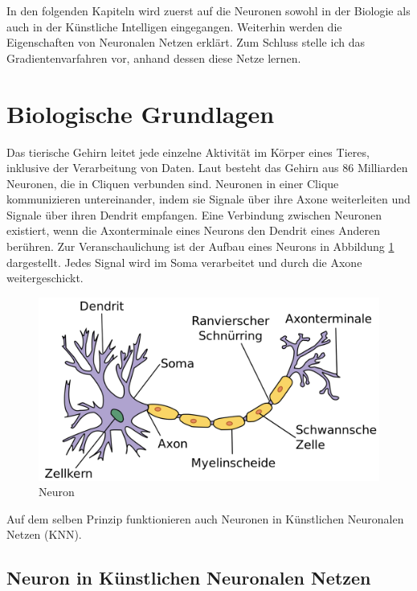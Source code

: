 In den folgenden Kapiteln wird zuerst auf die Neuronen sowohl in der Biologie als auch in der Künstliche Intelligen eingegangen. Weiterhin werden die Eigenschaften von Neuronalen Netzen erklärt. Zum Schluss stelle ich das Gradientenvarfahren vor, anhand dessen diese Netze lernen.

\section{Biologische Grundlagen}

Das tierische Gehirn leitet jede einzelne Aktivität im Körper eines Tieres, inklusive der Verarbeitung von Daten. Laut \cite{GEHIRN:12} besteht das Gehirn aus 86 Milliarden Neuronen, die in Cliquen verbunden sind. Neuronen in einer Clique kommunizieren untereinander, indem sie Signale über ihre Axone weiterleiten und Signale über ihren Dendrit empfangen. Eine Verbindung zwischen Neuronen existiert, wenn die Axonterminale eines Neurons den Dendrit eines Anderen berühren. Zur Veranschaulichung ist der Aufbau eines Neurons in Abbildung \ref{neuron} dargestellt. Jedes Signal wird im Soma verarbeitet und durch die Axone weitergeschickt.

\begin{figure}[!htbp]
	\centering
	\includegraphics[scale=0.2]{images/Neuron_(deutsch)-1.png}
	\caption{Neuron \cite{NWIKI:19}}\label{neuron}
\end{figure}

Auf dem selben Prinzip funktionieren auch Neuronen in Künstlichen Neuronalen Netzen (KNN). \cite{NWIKI:19} \cite{GEHIRN:12}

\subsection{Neuron in Künstlichen Neuronalen Netzen}

